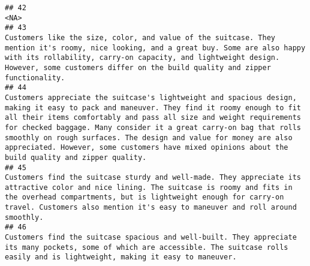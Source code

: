 \documentclass[
]{article}
\begin{document}
\begin{verbatim}
## 42                                                                                                                                                                                                                                                                                                                                                                                                                                                                                                                                                                                                                       <NA>
## 43                                                                                                                                                                                                                                                                                                                                      Customers like the size, color, and value of the suitcase. They mention it's roomy, nice looking, and a great buy. Some are also happy with its rollability, carry-on capacity, and lightweight design. However, some customers differ on the build quality and zipper functionality.
## 44                                                                                                                                                            Customers appreciate the suitcase's lightweight and spacious design, making it easy to pack and maneuver. They find it roomy enough to fit all their items comfortably and pass all size and weight requirements for checked baggage. Many consider it a great carry-on bag that rolls smoothly on rough surfaces. The design and value for money are also appreciated. However, some customers have mixed opinions about the build quality and zipper quality.
## 45                                                                                                                                                                                                                                                                                                                                 Customers find the suitcase sturdy and well-made. They appreciate its attractive color and nice lining. The suitcase is roomy and fits in the overhead compartments, but is lightweight enough for carry-on travel. Customers also mention it's easy to maneuver and roll around smoothly.
## 46                                                                                                                                                                                                                                                                                                                                                                                                                             Customers find the suitcase spacious and well-built. They appreciate its many pockets, some of which are accessible. The suitcase rolls easily and is lightweight, making it easy to maneuver.

\end{verbatim}
\end{document}
